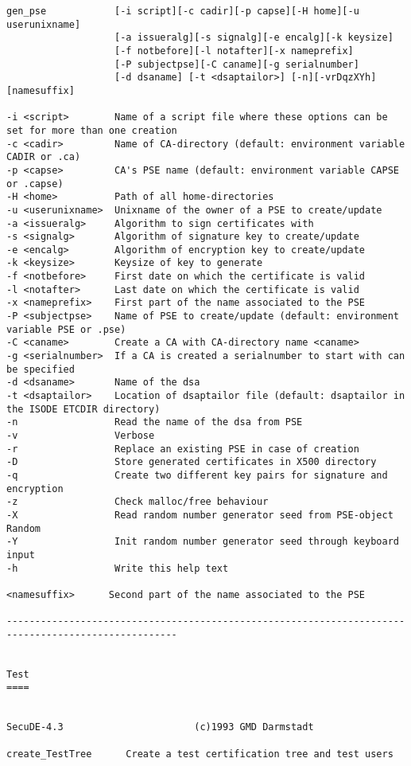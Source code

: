 {\begin{verbatim}
gen_pse            [-i script][-c cadir][-p capse][-H home][-u userunixname]
                   [-a issueralg][-s signalg][-e encalg][-k keysize]
                   [-f notbefore][-l notafter][-x nameprefix]
                   [-P subjectpse][-C caname][-g serialnumber]
                   [-d dsaname] [-t <dsaptailor>] [-n][-vrDqzXYh][namesuffix]
                   
-i <script>        Name of a script file where these options can be set for more than one creation
-c <cadir>         Name of CA-directory (default: environment variable CADIR or .ca)
-p <capse>         CA's PSE name (default: environment variable CAPSE or .capse)
-H <home>          Path of all home-directories
-u <userunixname>  Unixname of the owner of a PSE to create/update
-a <issueralg>     Algorithm to sign certificates with
-s <signalg>       Algorithm of signature key to create/update
-e <encalg>        Algorithm of encryption key to create/update
-k <keysize>       Keysize of key to generate
-f <notbefore>     First date on which the certificate is valid
-l <notafter>      Last date on which the certificate is valid
-x <nameprefix>    First part of the name associated to the PSE
-P <subjectpse>    Name of PSE to create/update (default: environment variable PSE or .pse)
-C <caname>        Create a CA with CA-directory name <caname>
-g <serialnumber>  If a CA is created a serialnumber to start with can be specified
-d <dsaname>       Name of the dsa
-t <dsaptailor>    Location of dsaptailor file (default: dsaptailor in the ISODE ETCDIR directory)
-n                 Read the name of the dsa from PSE
-v                 Verbose
-r                 Replace an existing PSE in case of creation
-D                 Store generated certificates in X500 directory
-q                 Create two different key pairs for signature and encryption
-z                 Check malloc/free behaviour
-X                 Read random number generator seed from PSE-object Random
-Y                 Init random number generator seed through keyboard input
-h                 Write this help text
                   
<namesuffix>      Second part of the name associated to the PSE

----------------------------------------------------------------------------------------------------


Test
====


SecuDE-4.3 						 (c)1993 GMD Darmstadt 
 
create_TestTree 	 Create a test certification tree and test users 
 

\end{verbatim}}

